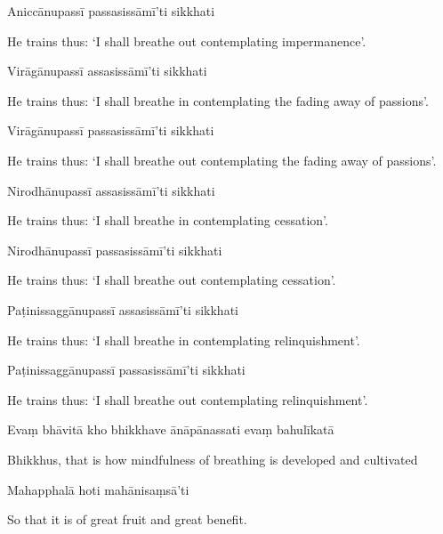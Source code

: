 Aniccānupassī passasissāmī'ti sikkhati

\begin{english}
  He trains thus: `I shall breathe out contemplating impermanence'.
\end{english}

Virāgānupassī assasissāmī'ti sikkhati

\begin{english}
  He trains thus: `I shall breathe in contemplating the fading away of passions'.
\end{english}

Virāgānupassī passasissāmī'ti sikkhati

\begin{english}
  He trains thus: `I shall breathe out contemplating the fading away of passions'.
\end{english}

Nirodhānupassī assasissāmī'ti sikkhati

\begin{english}
  He trains thus: `I shall breathe in contemplating cessation'.
\end{english}

Nirodhānupassī passasissāmī'ti sikkhati

\begin{english}
  He trains thus: `I shall breathe out contemplating cessation'.
\end{english}

Paṭinissaggānupassī assasissāmī'ti sikkhati

\begin{english}
  He trains thus: `I shall breathe in contemplating relinquishment'.
\end{english}

Paṭinissaggānupassī passasissāmī'ti sikkhati

\begin{english}
  He trains thus: `I shall breathe out contemplating relinquishment'.
\end{english}

Evaṃ bhāvitā kho bhikkhave ānāpānassati evaṃ bahulīkatā

\begin{english}
  Bhikkhus, that is how mindfulness of breathing is developed and cultivated
\end{english}

Mahapphalā hoti mahānisaṃsā'ti

\begin{english}
  So that it is of great fruit and great benefit.
\end{english}

